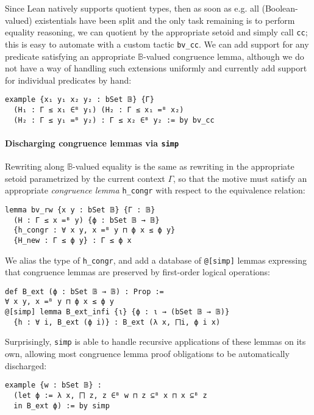 \documentclass[sigplan,10pt,review, anonymous]{acmart}
\newcommand{\lil}{\lstinline}
\theoremstyle{definition}
\begin{document}
Since Lean natively supports quotient types, then as soon as e.g. all (Boolean-valued) existentials have been split and the only task remaining is to perform equality reasoning,
we can quotient by the appropriate setoid and simply call \lil{cc};
this is easy to automate with a custom tactic \lil{bv_cc}. %
We can add support for any predicate satisfying an appropriate \(\mathbb{B}\)-valued congruence lemma,
although we do not have a way of handling such extensions uniformly and currently add support for individual predicates by hand:
\begin{lstlisting}
example {x₁ y₁ x₂ y₂ : bSet 𝔹} {Γ}
  (H₁ : Γ ≤ x₁ ∈ᴮ y₁) (H₂ : Γ ≤ x₁ =ᴮ x₂)
  (H₂ : Γ ≤ y₁ =ᴮ y₂) : Γ ≤ x₂ ∈ᴮ y₂ := by bv_cc
\end{lstlisting}
\paragraph{Discharging congruence lemmas via \texttt{simp}} \label{subsect:B-ext} Rewriting along \(\mathbb{B}\)-valued equality is the same as rewriting in the appropriate setoid parametrized by the current context \(\Gamma\), %
so that the motive must satisfy an appropriate \emph{congruence lemma} \lil{h_congr} with respect to the equivalence relation:
\begin{lstlisting}
lemma bv_rw {x y : bSet 𝔹} {Γ : 𝔹}
  (H : Γ ≤ x =ᴮ y) {ϕ : bSet 𝔹 → 𝔹}
  {h_congr : ∀ x y, x =ᴮ y ⊓ ϕ x ≤ ϕ y}
  {H_new : Γ ≤ ϕ y} : Γ ≤ ϕ x
\end{lstlisting}
We alias the type of \lil{h_congr}, and add a database of \lil{@[simp]} lemmas expressing that congruence lemmas are preserved by first-order logical operations:
\begin{lstlisting}
def B_ext (ϕ : bSet 𝔹 → 𝔹) : Prop :=
∀ x y, x =ᴮ y ⊓ ϕ x ≤ ϕ y
@[simp] lemma B_ext_infi {ι} {ϕ : ι → (bSet 𝔹 → 𝔹)}
  {h : ∀ i, B_ext (ϕ i)} : B_ext (λ x, ⨅i, ϕ i x)
\end{lstlisting}
Surprisingly, \lil{simp} is able to handle recursive applications of these lemmas on its own, allowing most congruence lemma proof obligations to be automatically discharged:
\begin{lstlisting}
example {w : bSet 𝔹} :
  (let ϕ := λ x, ⨅ z, z ∈ᴮ w ⊓ z ⊆ᴮ x ⊓ x ⊆ᴮ z
  in B_ext ϕ) := by simp
\end{lstlisting}
\end{document}
